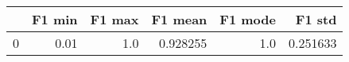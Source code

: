 \begin{tabular}{lrrrrr}
\toprule
{} &  F1 min &  F1 max &   F1 mean &  F1 mode &    F1 std \\
\midrule
0 &    0.01 &     1.0 &  0.928255 &      1.0 &  0.251633 \\
\bottomrule
\end{tabular}
